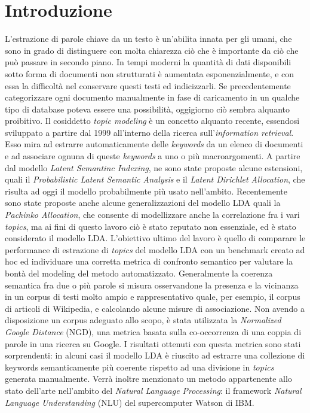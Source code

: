 \documentclass[]{article}
\begin{document}
\section{Introduzione}
L'estrazione di parole chiave da un testo è un'abilita innata per gli umani, che sono in grado di distinguere con molta chiarezza ciò che è importante da ciò che può passare in secondo piano. \newline
In tempi moderni la quantità di dati disponibili sotto forma di documenti non strutturati è aumentata esponenzialmente, e con essa la difficoltà nel conservare questi testi ed indicizzarli. Se precedentemente categorizzare ogni documento manualmente in fase di caricamento in un qualche tipo di database poteva essere una possibilità, oggigiorno ciò sembra alquanto proibitivo. \newline
Il  cosiddetto \textit{topic modeling} è un concetto alquanto recente, essendosi sviluppato a partire dal 1999 all'interno della ricerca sull'\textit{information retrieval}. \cite{1999}
Esso mira ad estrarre automaticamente delle \textit{keywords} da un elenco di documenti e ad associare ognuna di queste \textit{keywords} a uno o più macroargomenti. \newline
A partire dal modello \textit{Latent Semantinc Indexing}, ne sono state proposte alcune estensioni, quali il \textit{Probabilistic Latent Semantic Analysis} e il \textit{Latent Dirichlet Allocation}, che risulta ad oggi il modello probabilmente più usato nell'ambito. Recentemente sono state proposte anche alcune generalizzazioni del modello LDA quali la \textit{Pachinko Allocation}, che consente di modellizzare anche la correlazione fra i vari \textit{topics}, ma ai fini di questo lavoro ciò è stato reputato non essenziale, ed è stato considerato il modello LDA.  \cite{survey} \newline
L'obiettivo ultimo del lavoro è quello di comparare le performance di estrazione di \textit{topics} del modello LDA con un benchmark creato ad hoc ed individuare una corretta metrica di confronto semantico per valutare la bontà del modeling del metodo automatizzato. \newline
Generalmente la coerenza semantica fra due o più parole si misura osservandone la presenza e la vicinanza in un corpus di testi molto ampio e rappresentativo quale, per esempio, il corpus di articoli di Wikipedia, e calcolando alcune misure di associazione.\cite{ReadingTeaLeaves}
Non avendo a disposizione un corpus adeguato allo scopo, è stata utilizzata la \textit{Normalized Google Distance} (NGD), una metrica basata sulla co-occorrenza di una coppia di parole in una ricerca su Google. \cite{NGD}
I risultati ottenuti con questa metrica sono stati sorprendenti: in alcuni casi il modello LDA è riuscito ad estrarre una collezione di keywords semanticamente più coerente rispetto ad una divisione in \textit{topics} generata manualmente.
Verrà inoltre menzionato un metodo appartenente allo stato dell'arte nell'ambito del \textit{Natural Language Processing}: il framework \textit{Natural Language Understanding} (NLU) del supercomputer Watson di IBM. \cite{watson}
\end{document}
